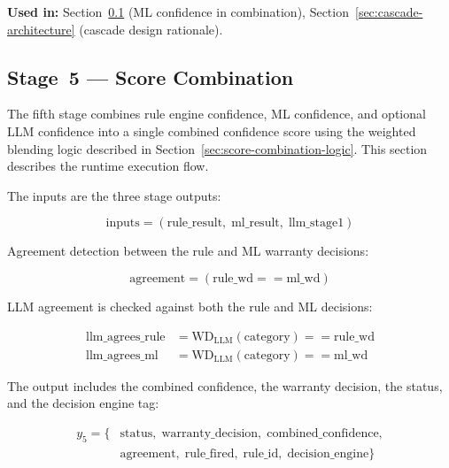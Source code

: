 \documentclass[10pt,a4paper]{article}
\begin{document}
\textbf{Used in:} Section~\ref{sec:stage5-score-combination} (ML confidence in combination), Section~\ref{sec:cascade-architecture} (cascade design rationale).

\subsection{Stage~5 --- Score Combination}
\label{sec:stage5-score-combination}

The fifth stage combines rule engine confidence, ML confidence, and optional LLM confidence into a single combined confidence score using the weighted blending logic described in Section~\ref{sec:score-combination-logic}. This section describes the runtime execution flow.

The inputs are the three stage outputs:

\begin{equation}
\text{inputs} = (\text{rule\_result},\; \text{ml\_result},\; \text{llm\_stage1})
\label{eq:stage5-input}
\end{equation}

Agreement detection between the rule and ML warranty decisions:

\begin{equation}
\text{agreement} = (\text{rule\_wd} == \text{ml\_wd})
\label{eq:stage5-agreement}
\end{equation}

LLM agreement is checked against both the rule and ML decisions:

\begin{align}
\text{llm\_agrees\_rule} &= \text{WD}_{\text{LLM}}(\text{category}) == \text{rule\_wd} \label{eq:stage5-llm-rule} \\
\text{llm\_agrees\_ml}   &= \text{WD}_{\text{LLM}}(\text{category}) == \text{ml\_wd} \label{eq:stage5-llm-ml}
\end{align}

The output includes the combined confidence, the warranty decision, the status, and the decision engine tag:

\begin{equation}
\begin{split}
y_5 = \{&\text{status},\; \text{warranty\_decision},\; \text{combined\_confidence},\\
&\text{agreement},\; \text{rule\_fired},\; \text{rule\_id},\; \text{decision\_engine}\}
\end{split}
\label{eq:stage5-output}
\end{equation}
\end{document}
